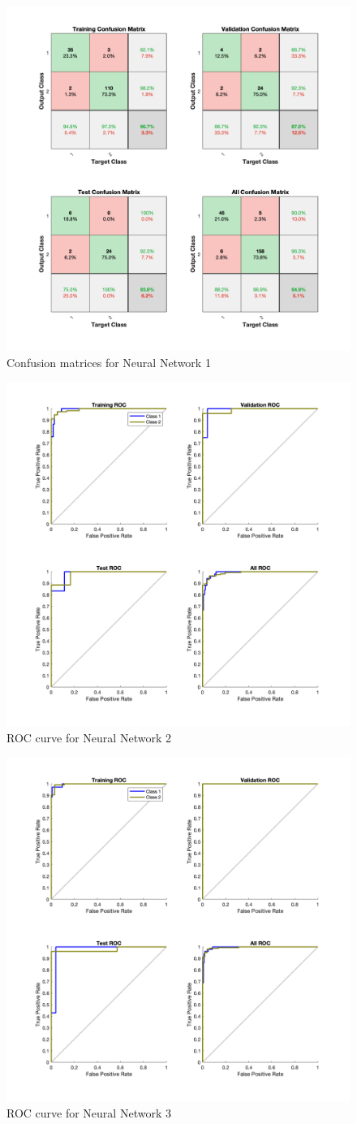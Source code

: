 \documentclass[9pt,technote]{IEEEtran}
\begin{document}
\begin{figure}
	\centering
	\includegraphics[width=0.7\linewidth]{Resources/confusion_matrix_1_layers_10}
	\caption{Confusion matrices for Neural Network 1}
	\label{fig:confusionmatrix1layers10}
\end{figure}
\begin{figure}
	\centering
	\includegraphics[width=0.7\linewidth]{Resources/receiver_operating_characteristic_1_layers_20}
	\caption{ROC curve for Neural Network 2}
	\label{fig:receiveroperatingcharacteristic1layers20}
\end{figure}
\begin{figure}
	\centering
	\includegraphics[width=0.7\linewidth]{Resources/receiver_operting_characteristic_4_layers_20-10-5}
	\caption{ROC curve for Neural Network 3}
	\label{fig:receiveropertingcharacteristic4layers20-10-5}
\end{figure}
\end{document}
